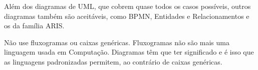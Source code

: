Além dos diagramas de UML, que cobrem quase todos os casos possíveis, outros diagramas também são aceitáveis, como BPMN, Entidades e Relacionamentos e os da família ARIS.

Não use fluxogramas ou caixas genéricas. Fluxogramas não são mais uma linguagem usada em Computação. Diagramas têm que ter significado e é isso que as linguagens padronizadas permitem, ao contrário de caixas genéricas.
